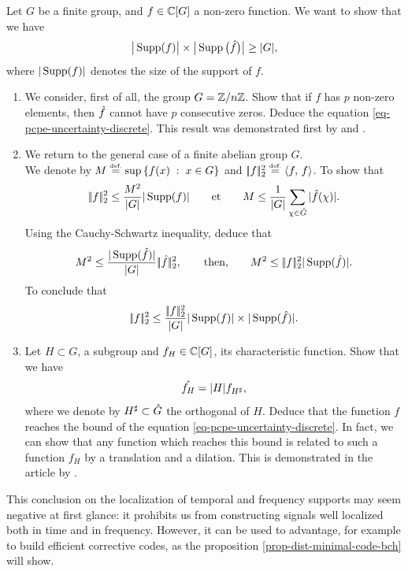 \begin{exo}
\label{exo-principle-uncertainty-discrete}

   
Let $G$ be a finite group, and $ f \in \mathbb{C}[G]$ a non-zero function. We want to show that we have
\begin{equation}
	\label{eq-pcpe-uncertainty-discrete}
\big |\operatorname{Supp} (f) \big |\times \big |\operatorname{Supp} \big(\hat{f} \big) \big |\geq |G|,
\end{equation}
where $|\operatorname{Supp} (f) |$ denotes the size of the support of $f$. 
\begin{enumerate}
\item We consider, first of all, the group $ G = \mathbb{Z}/n\mathbb{Z}$. Show that if $f$ has $ p $ non-zero elements, then $\hat{f}$ cannot have $ p $ consecutive zeros. Deduce the equation \eqref{eq-pcpe-uncertainty-discrete}. This result was demonstrated first by  and .
\item {} We return to the general case of a finite abelian group $G$. \\We denote by $ M \stackrel{\mbox{\upshape\tiny def.}}{=} \sup \left\{ f (x) \;:\; x \in G \right\}$ and $|\!| f |\!|_2^2 \stackrel{\mbox{\upshape\tiny def.}}{=} \langle f,\,f\rangle$. To show that
\begin{equation*}
|\!| f |\!|_2^2 \leq \frac{M^2}{|G|}|\operatorname{Supp} (f) |\quad \quad \text{et} \quad \quad M \leq \frac{1}{|G|} \sum_{\chi \in \hat{G}}{|\hat{f}(\chi) |}.
\end{equation*}
Using the Cauchy-Schwartz inequality, deduce that
\begin{equation*}
M^2 \leq \frac{|\operatorname{Supp}(\hat{f}) |}{|G|} |\!| \hat{f} |\!|_ 2^2, \quad \quad \text{then,} \quad \quad M^2 \leq |\!| f |\!|_2^2 |\operatorname{Supp}(\hat{f}) |.
\end{equation*}
To conclude that
\begin{equation*}
|\!| f |\!|_2^2 \leq \frac{|\!| f |\!|_2^2}{|G|}|\operatorname{Supp} (f) |\times |\operatorname{Supp}(\hat{f}) |.
\end{equation*}
\item {}  Let $ H \subset G$, a subgroup and $ f_H \in \mathbb{C}[G]$, its characteristic function. Show that we have
\begin{equation*}
\hat{f_H} = |H| f_{H^\sharp},
\end{equation*}
where we denote by $ H^\sharp \subset \hat{G}$ the orthogonal of $H$. Deduce that the function $f$ reaches the bound of the equation \eqref{eq-pcpe-uncertainty-discrete}. In fact, we can show that any function which reaches this bound is related to such a function $ f_H $ by a translation and a dilation. This is demonstrated in the article by .
\end{enumerate} 
This conclusion on the localization of temporal and frequency supports may seem negative at first glance: it prohibits us from constructing signals well localized both in time and in frequency. However, it can be used to advantage, for example to build efficient corrective codes, as the proposition \ref{prop-dist-minimal-code-bch} will show.
\end{exo}
